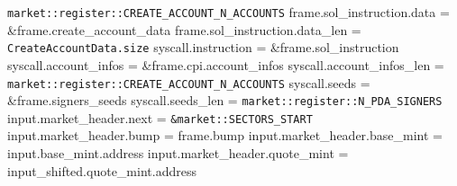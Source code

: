 \begin{algorithm}
\begin{algorithmic}
    \texttt{market::register::CREATE\_ACCOUNT\_N\_ACCOUNTS}
  \STATE frame.sol\_instruction.data = \&frame.create\_account\_data
  \STATE frame.sol\_instruction.data\_len = \texttt{CreateAccountData.size}
  \STATE syscall.instruction = \&frame.sol\_instruction
  \STATE syscall.account\_infos = \&frame.cpi.account\_infos
  \STATE syscall.account\_infos\_len =
    \texttt{market::register::CREATE\_ACCOUNT\_N\_ACCOUNTS}
  \STATE syscall.seeds = \&frame.signers\_seeds
  \STATE syscall.seeds\_len = \texttt{market::register::N\_PDA\_SIGNERS}
  \STATE {}
  \STATE input.market\_header.next = \texttt{\&market::SECTORS\_START}
  \STATE input.market\_header.bump = frame.bump
  \STATE input.market\_header.base\_mint = input.base\_mint.address
  \STATE input.market\_header.quote\_mint = input\_shifted.quote\_mint.address
\ENDPROCEDURE
\end{algorithmic}
\end{algorithm}
